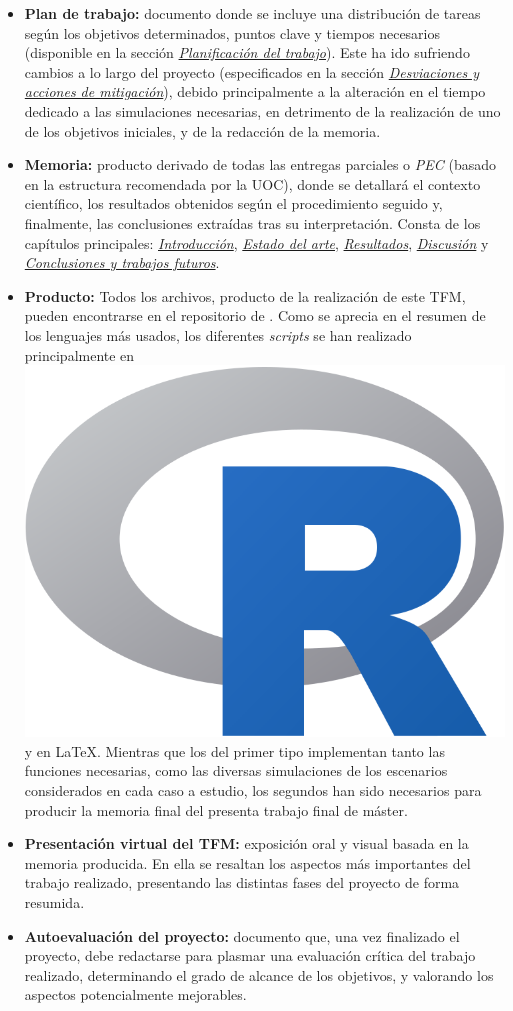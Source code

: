 \documentclass[IB,BIB]{TFUOC}%
\newcommand{\Rlogo}{\protect\includegraphics[height=2.5ex,keepaspectratio]{Rlogo.png}}
\begin{document}
\footnotesize

\begin{itemize}
    \item \textbf{Plan de trabajo:} documento donde se incluye una distribución de tareas según los objetivos determinados, puntos clave y tiempos necesarios (disponible en la sección \textit{\hyperref[sec:Planificación del trabajo]{Planificación del trabajo}}). Este ha ido sufriendo cambios a lo largo del proyecto (especificados en la sección \textit{\hyperref[sec:Desviaciones y acciones de mitigación]{Desviaciones y acciones de mitigación}}), debido principalmente a la alteración en el tiempo dedicado a las simulaciones necesarias, en detrimento de la realización de uno de los objetivos iniciales, y de la redacción de la memoria.
    \item \textbf{Memoria:} producto derivado de todas las entregas parciales o \textit{PEC} (basado en la estructura recomendada por la UOC), donde se detallará el contexto científico, los resultados obtenidos según el procedimiento seguido y, finalmente, las conclusiones extraídas tras su interpretación. Consta de los capítulos principales: \textit{\hyperref[chap:Introducción]{Introducción}}, \textit{\hyperref[chap:Estado del arte]{Estado del arte}}, \textit{\hyperref[chap:Resultados]{Resultados}}, \textit{\hyperref[chap:Discusión]{Discusión}} y \textit{\hyperref[chap:Conclusiones y trabajos futuros]{Conclusiones y trabajos futuros}}.
    \item \textbf{Producto:} Todos los archivos, producto de la realización de este TFM, pueden encontrarse en el repositorio de  \cite{aitor_invernon_de_campos_codigo_2024}. Como se aprecia en el resumen de los lenguajes más usados, los diferentes \textit{scripts} se han realizado principalmente en \hspace{-.2em}\Rlogo\hspace{+.1em} y en \LaTeX. Mientras que los del primer tipo implementan tanto las funciones necesarias, como las diversas simulaciones de los escenarios considerados en cada caso a estudio, los segundos han sido necesarios para producir la memoria final del presenta trabajo final de máster.
    \item \textbf{Presentación virtual del TFM:} exposición oral y visual basada en la memoria producida. En ella se resaltan los aspectos más importantes del trabajo realizado, presentando las distintas fases del proyecto de forma resumida.
    \item \textbf{Autoevaluación del proyecto:} documento que, una vez finalizado el proyecto, debe redactarse para plasmar una evaluación crítica del trabajo realizado, determinando el grado de alcance de los objetivos, y valorando los aspectos potencialmente mejorables.
\end{itemize}
\end{document}

